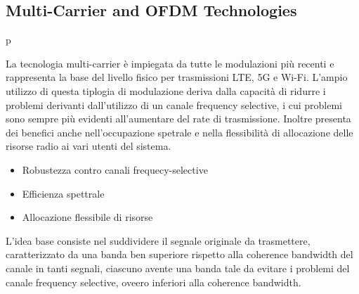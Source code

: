 \subsection*{Multi-Carrier and OFDM Technologies}

p





La tecnologia multi-carrier è impiegata da tutte le modulazioni più recenti e rappresenta la base del livello fisico per trasmissioni LTE, 5G e Wi-Fi. 
L'ampio utilizzo di questa tiplogia di modulazione deriva dalla capacità di ridurre i problemi derivanti dall'utilizzo di un canale frequency selective, i cui problemi sono sempre più evidenti all'aumentare del rate di trasmissione. Inoltre presenta dei benefici anche nell'occupazione spetrale e nella flessibilità di allocazione delle risorse radio ai vari utenti del sistema.
\begin{itemize}
    \item Robustezza contro canali frequecy-selective
    \item Efficienza spettrale
    \item Allocazione flessibile di risorse
\end{itemize}

L'idea base consiste nel suddividere il segnale originale da trasmettere, caratterizzato da una banda ben superiore rispetto alla coherence bandwidth del canale in tanti segnali, ciascuno avente una banda tale da evitare i problemi del canale frequency selective, oveero inferiori alla coherence bandwidth.



